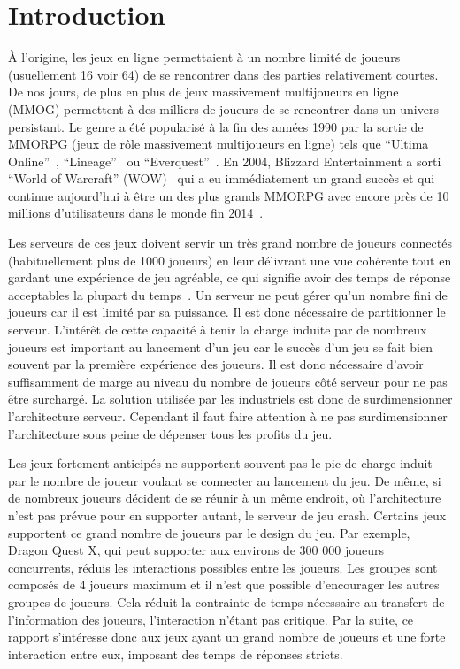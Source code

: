 \section{Introduction}
\`A l'origine, les jeux en ligne permettaient à un nombre limité de joueurs (usuellement 16 voir 64) de se rencontrer dans des parties relativement courtes.
De nos jours, de plus en plus de jeux massivement multijoueurs en ligne (MMOG) permettent à des milliers de joueurs de se rencontrer dans un univers persistant.
Le genre a été popularisé à la fin des années 1990 par la sortie de MMORPG (jeux de rôle massivement multijoueurs en ligne) tels que ``Ultima Online''~\cite{ultima_online}, ``Lineage''~\cite{lineage} ou ``Everquest''~\cite{everquest}.
En 2004, Blizzard Entertainment a sorti ``World of Warcraft'' (WOW)~\cite{wow} qui a eu immédiatement un grand succès et qui continue aujourd'hui à être un des plus grands MMORPG avec encore près de 10 millions d'utilisateurs dans le monde fin 2014~\cite{wow_player_num}.

Les serveurs de ces jeux doivent servir un très grand nombre de joueurs connectés (habituellement plus de 1000 joueurs) en leur délivrant une vue cohérente tout en gardant une expérience de jeu agréable, ce qui signifie avoir des temps de réponse acceptables la plupart du temps~\cite{latency_can_kill}.
Un serveur ne peut gérer qu'un nombre fini de joueurs car il est limité par sa puissance.
Il est donc nécessaire de partitionner le serveur.
L'intérêt de cette capacité à tenir la charge induite par de nombreux joueurs est important au lancement d'un jeu car le succès d'un jeu se fait bien souvent par la première expérience des joueurs.
Il est donc nécessaire d'avoir suffisamment de marge au niveau du nombre de joueurs côté serveur pour ne pas être surchargé.
La solution utilisée par les industriels est donc de surdimensionner l'architecture serveur.
Cependant il faut faire attention à ne pas surdimensionner l'architecture sous peine de dépenser tous les profits du jeu.

Les jeux fortement anticipés ne supportent souvent pas le pic de charge induit par le nombre de joueur voulant se connecter au lancement du jeu.
De même, si de nombreux joueurs décident de se réunir à un même endroit, où l'architecture n'est pas prévue pour en supporter autant, le serveur de jeu crash.
Certains jeux supportent ce grand nombre de joueurs par le design du jeu.
Par exemple, Dragon Quest X, qui peut supporter aux environs de 300 000 joueurs concurrents, réduis les interactions possibles entre les joueurs.
Les groupes sont composés de 4 joueurs maximum et il n'est que possible d'encourager les autres groupes de joueurs.
Cela réduit la contrainte de temps nécessaire au transfert de l'information des joueurs, l'interaction n'étant pas critique.
Par la suite, ce rapport s'intéresse donc aux jeux ayant un grand nombre de joueurs et une forte interaction entre eux, imposant des temps de réponses stricts.

